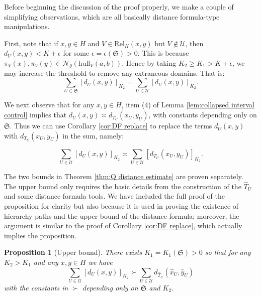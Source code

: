 \documentclass{amsart}
\newtheorem{proposition}[theorem]{Proposition}
\theoremstyle{definition}
\theoremstyle{remark}
\theoremstyle{definition}
\newcommand{\calN}{\mathcal{N}}
\newcommand{\calU}{\mathcal{U}}
\newcommand{\hT}{\widehat{T}}
\newcommand{\hx}{\hat{x}}
\newcommand{\hy}{\hat{y}}
\newcommand{\Rel}{\mathrm{Rel}}
\newcommand{\hull}{\mathrm{hull}}
\begin{document}
Before beginning the discussion of the proof properly, we make a couple of simplifying observations, which are all basically distance formula-type manipulations.

First, note that if $x,y \in H$ and $V \in \Rel_K(x,y)$ but $V \notin \calU$, then $d_V(x,y) < K + \epsilon$ for some $\epsilon = \epsilon(\mathfrak S)>0$.  This is because $\pi_V(x), \pi_V(y) \in \calN_{\theta}(\hull_V(a,b))$.  Hence by taking $K_2 \geq K_1 > K + \epsilon$, we may increase the threshold to remove any extraneous domains.  That is:
$$\sum_{U \in \mathfrak S} [d_U(x,y)]_{K_2} = \sum_{U \in \calU} [d_U(x,y)]_{K_2}.$$

We next observe that for any $x,y \in H$, item (4) of Lemma \ref{lem:collapsed interval control} implies that $d_U(x,y) \asymp d_{T_U}(x_U, y_U)$, with constants depending only on $\mathfrak S$.  Thus we can use Corollary \ref{cor:DF replace} to replace the terms $d_U(x,y)$ with $d_{T_U}(x_U,y_U)$ in the sum, namely:

$$\sum_{U \in \calU} [d_U(x,y)]_{K_2} \asymp \sum_{U \in \calU} [d_{T_U}(x_U,y_U)]_{K_2}.$$

The two bounds in Theorem \ref{thm:Q distance estimate} are proven separately.  The upper bound only requires the basic details from the construction of the $\hT_U$ and some distance formula tools.  We have included the full proof of the proposition for clarity but also because it is used in proving the existence of hierarchy paths and the upper bound of the distance formula; moreover, the argument is similar to the proof of Corollary \ref{cor:DF replace}, which actually implies the proposition.

\begin{proposition}[Upper bound]\label{prop:upper bound}
There exists $K_1= K_1(\mathfrak S)>0$ so that for any $K_2 >K_1$ and any $x, y \in H$ we have
\begin{equation}\label{eqn:upper}
    \sum_{U \in \calU} [d_U(x,y)]_{K_2} \succ \sum_{U \in \calU} d_{\hT_U}(\hx_U,\hy_U)
\end{equation}
with the constants in $\succ$ depending only on $\mathfrak S$ and $K_2$.
\end{proposition}
\end{document}
